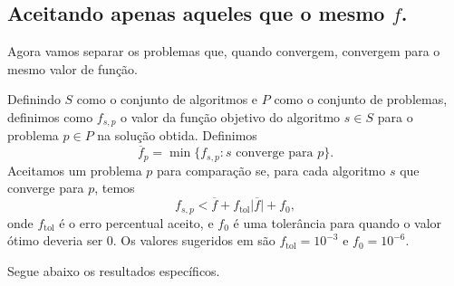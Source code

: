 \documentclass{article}
\newcommand{\ftol}{f_{\mbox{tol}}}
\begin{document}
\subsection{Aceitando apenas aqueles que o mesmo $f$. }

Agora vamos separar os problemas que, quando convergem, convergem para o mesmo
valor de função.

Definindo $S$ como o conjunto de algoritmos e $P$ como o conjunto de problemas,
definimos como $f_{s,p}$ o valor da função objetivo do algoritmo $s \in S$ para
o problema $p \in P$ na solução obtida.
Definimos
$$ \overline{f}_{p} = \min\{f_{s,p} : s \mbox{ converge para } p\}. $$
Aceitamos um problema $p$ para comparação se, para cada algoritmo $s$ que
converge para $p$, temos
$$ f_{s,p} < \overline{f} + \ftol\vert\overline{f}\vert + f_0, $$
onde $\ftol$ é o erro percentual aceito, e $f_0$ é uma tolerância para quando o
valor ótimo deveria ser $0$.
Os valores sugeridos em \cite{bib:compare-optimal-values} são $\ftol=10^{-3}$ e
$f_0 = 10^{-6}$.

Segue abaixo os resultados específicos.





\end{document}
